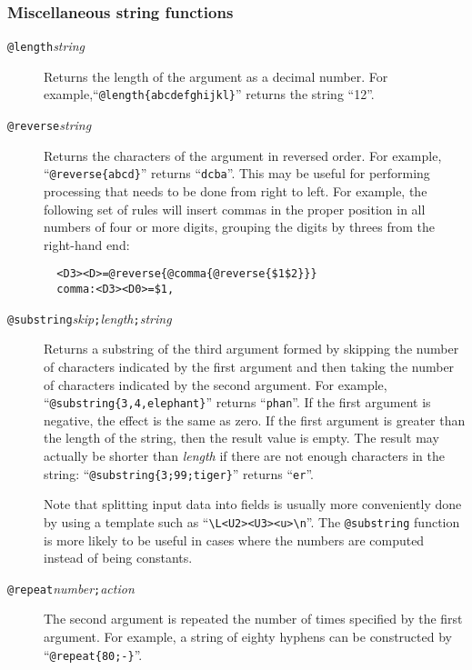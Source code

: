 \subsubsection{Miscellaneous string functions}
\begin{description}
\item[{\tt @length\ttlb}{\it string}{\tt \ttrb}]
\begin{flushleft}
Returns the length of the argument as a decimal number.
For example,``\verb/@length{abcdefghijkl}/'' returns the string ``12''.
\end{flushleft}

\item[{\tt @reverse\ttlb}{\it string}{\tt \ttrb}]
Returns the characters of the argument in reversed order.
\newline
For example, ``\verb/@reverse{abcd}/'' returns ``\verb/dcba/''.
This may be useful for performing processing that needs to be done from
right to left.  For example, the following set of rules will insert
commas in the proper position in all numbers of four or more digits,
grouping the digits by threes from the right-hand end:
\begin{verbatim}
  <D3><D>=@reverse{@comma{@reverse{$1$2}}}
  comma:<D3><D0>=$1,
\end{verbatim}

\item[{\tt @substring\ttlb}{\it skip}{\tt ;}{\it length}{\tt ;}{\it string}{\tt \ttrb}]
Returns a substring of the third argument formed by skipping the number of
characters indicated by the first argument and then taking the number of
characters indicated by the second argument.
For example, ``\verb/@substring{3,4,elephant}/'' returns ``\verb/phan/''.
If the first argument is negative, the effect is the same as zero.
If the first argument is greater than the length of the string, then the
result value is empty.  The result may actually be shorter than {\it
length} if there are not enough characters in the string:
``\verb/@substring{3;99;tiger}/'' returns ``\verb/er/''.

Note that splitting input data into fields is usually more conveniently
done by using a template such as ``\verb/\L<U2><U3><u>\n/''.  The
\verb/@substring/ function is more likely to be useful in cases where
the numbers are computed instead of being constants.

\item[{\tt @repeat\ttlb}{\it number}{\tt ;}{\it action}{\tt \ttrb}]
The second argument is repeated the number of times specified by the
first argument.  For example, a string of eighty hyphens can be
constructed by ``\verb/@repeat{80;-}/''.


\end{description}

